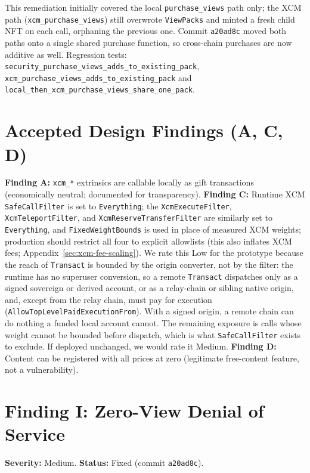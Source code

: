 This remediation initially covered the local \texttt{purchase\_views} path only; the XCM path (\texttt{xcm\_purchase\_views}) still overwrote \texttt{ViewPacks} and minted a fresh child NFT on each call, orphaning the previous one. Commit \texttt{a20ad8c} moved both paths onto a single shared purchase function, so cross-chain purchases are now additive as well. Regression tests: \texttt{security\_purchase\_views\_adds\_to\_existing\_pack}, \texttt{xcm\_purchase\_views\_adds\_to\_existing\_pack} and \texttt{local\_then\_xcm\_purchase\_views\_share\_one\_pack}.

\section{Accepted Design Findings (A, C, D)}\label{sec:d-accepted}

\textbf{Finding A:} \texttt{xcm\_*} extrinsics are callable locally as gift transactions (economically neutral; documented for transparency). \textbf{Finding C:} Runtime XCM \texttt{SafeCallFilter} is set to \texttt{Everything}; the \texttt{XcmExecuteFilter}, \texttt{XcmTeleportFilter}, and \texttt{XcmReserve\allowbreak TransferFilter} are similarly set to \texttt{Everything}, and \texttt{FixedWeightBounds} is used in place of measured XCM weights; production should restrict all four to explicit allowlists (this also inflates XCM fees; Appendix~\ref{sec:xcm-fee-scaling}). We rate this Low for the prototype because the reach of \texttt{Transact} is bounded by the origin converter, not by the filter: the runtime has no superuser conversion, so a remote \texttt{Transact} dispatches only as a signed sovereign or derived account, or as a relay-chain or sibling native origin, and, except from the relay chain, must pay for execution (\texttt{AllowTopLevelPaidExecutionFrom}). With a signed origin, a remote chain can do nothing a funded local account cannot. The remaining exposure is calls whose weight cannot be bounded before dispatch, which is what \texttt{SafeCallFilter} exists to exclude. If deployed unchanged, we would rate it Medium. \textbf{Finding D:} Content can be registered with all prices at zero (legitimate free-content feature, not a vulnerability).

\section{Finding I: Zero-View Denial of Service}\label{subsec:finding-i}

\textbf{Severity:} Medium. \textbf{Status:} Fixed (commit \texttt{a20ad8c}).

